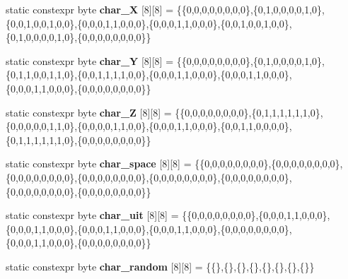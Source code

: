 \begin{DoxyCompactItemize}
\item 
static constexpr byte {\bfseries char\+\_\+X} \mbox{[}8\mbox{]}\mbox{[}8\mbox{]} = \{\{0,0,0,0,0,0,0,0\},\{0,1,0,0,0,0,1,0\},\{0,0,1,0,0,1,0,0\},\{0,0,0,1,1,0,0,0\},\{0,0,0,1,1,0,0,0\},\{0,0,1,0,0,1,0,0\},\{0,1,0,0,0,0,1,0\},\{0,0,0,0,0,0,0,0\}\}\hypertarget{classcharacters_aa34ddeb27fffcd4db88819d29dc0e5a1}{}\label{classcharacters_aa34ddeb27fffcd4db88819d29dc0e5a1}

\item 
static constexpr byte {\bfseries char\+\_\+Y} \mbox{[}8\mbox{]}\mbox{[}8\mbox{]} = \{\{0,0,0,0,0,0,0,0\},\{0,1,0,0,0,0,1,0\},\{0,1,1,0,0,1,1,0\},\{0,0,1,1,1,1,0,0\},\{0,0,0,1,1,0,0,0\},\{0,0,0,1,1,0,0,0\},\{0,0,0,1,1,0,0,0\},\{0,0,0,0,0,0,0,0\}\}\hypertarget{classcharacters_aa780ed4d40bf8f1721f031c21a39cf6a}{}\label{classcharacters_aa780ed4d40bf8f1721f031c21a39cf6a}

\item 
static constexpr byte {\bfseries char\+\_\+Z} \mbox{[}8\mbox{]}\mbox{[}8\mbox{]} = \{\{0,0,0,0,0,0,0,0\},\{0,1,1,1,1,1,1,0\},\{0,0,0,0,0,1,1,0\},\{0,0,0,0,1,1,0,0\},\{0,0,0,1,1,0,0,0\},\{0,0,1,1,0,0,0,0\},\{0,1,1,1,1,1,1,0\},\{0,0,0,0,0,0,0,0\}\}\hypertarget{classcharacters_aee90f27bd7551cb4e72359c652d5652d}{}\label{classcharacters_aee90f27bd7551cb4e72359c652d5652d}

\item 
static constexpr byte {\bfseries char\+\_\+space} \mbox{[}8\mbox{]}\mbox{[}8\mbox{]} = \{\{0,0,0,0,0,0,0,0\},\{0,0,0,0,0,0,0,0\},\{0,0,0,0,0,0,0,0\},\{0,0,0,0,0,0,0,0\},\{0,0,0,0,0,0,0,0\},\{0,0,0,0,0,0,0,0\},\{0,0,0,0,0,0,0,0\},\{0,0,0,0,0,0,0,0\}\}\hypertarget{classcharacters_a9b544e2023450ad1b9a026b6d92f1fe2}{}\label{classcharacters_a9b544e2023450ad1b9a026b6d92f1fe2}

\item 
static constexpr byte {\bfseries char\+\_\+uit} \mbox{[}8\mbox{]}\mbox{[}8\mbox{]} = \{\{0,0,0,0,0,0,0,0\},\{0,0,0,1,1,0,0,0\},\{0,0,0,1,1,0,0,0\},\{0,0,0,1,1,0,0,0\},\{0,0,0,1,1,0,0,0\},\{0,0,0,0,0,0,0,0\},\{0,0,0,1,1,0,0,0\},\{0,0,0,0,0,0,0,0\}\}\hypertarget{classcharacters_aca03e3550c7ccb9102d079210fb99457}{}\label{classcharacters_aca03e3550c7ccb9102d079210fb99457}

\item 
static constexpr byte {\bfseries char\+\_\+random} \mbox{[}8\mbox{]}\mbox{[}8\mbox{]} = \{\{\},\{\},\{\},\{\},\{\},\{\},\{\},\{\}\}\hypertarget{classcharacters_ac276d3bf1d1a694ce62dee372f426a7d}{}\label{classcharacters_ac276d3bf1d1a694ce62dee372f426a7d}


\end{DoxyCompactItemize}
